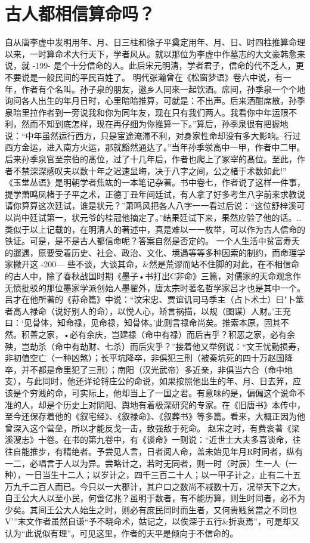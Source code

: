{{\section{古人都相信算命吗？}
自从唐李虚中发明用年、月、日三柱和徐子平奠定用年、月、日、时四柱推算命理以来，一时算命术大行天下，学者风从。就以那位为李虚中作墓志的大文豪韩愈来说，就
-199-
是个十分信命的人。此后宋元明清，学者君子，信命的代不乏人，更不要说是一般民间的平民百姓了。
明代张瀚曾在《松窗梦语》卷六中说，有一年，作者有个名叫。孙子泉的朋友，遨乡人同來一起饮酒。席间，孙季泉一个个地询问各人出生的年月日时，心里暗暗推算，可就是：不出声。后来洒酣席散，孙季泉暗里拉作者到一旁说我和你为同年友，现在只有我们两人。我看你中年运限不利，然而不知到底怎样，现在再仔细为你推算一下。”算后，孙季泉很有把握地说：“中年虽然运行西方，只是宦途淹滞不利，对身家性命却没有多大影响。行过西方金运，进入南方火运，那就豁然通达了。”当年孙季泶高中一甲，作者中二甲。后来孙季泉官至宗伯的髙位，过了十几年后，作者也爬上了冢宰的髙位。至此，作者不禁深深感叹夫以数十年之迟速显晦，决于八字之间，公之楮于术数如此!”
《玉堂丛语》是明朝学者焦竑的一本笔记杂著。书中卷七，作者说了这样一件事，提学萧鸣凤楮于子平之术，正德丁丑年间廷试，有人拿了好多考生八字前来求教说请你算算这次廷试，谁是状元？”萧鸣风把各人八字一一看过后说：“这位舒梓溪可以尚中廷试第一，状元爷的桂冠他摘定了。”结果廷试下来，果然应验了他的话。..
类似于以上记载的，在明清人的著述中，真是难以一一枚举，可以作为古人信命的铁证。可是，是不是古人都信命呢？答案自然是否定的。
一个人生活中贫富寿夭的遛遇，原要受着历史、社会、政治、文化、境遇等等多种因索的制约，而命理学家撇开这
-200—
些不谈，大谈其命，&然是荒谬而站不住脚的对此，在不相信命的古人中，除了春秋战国时期《墨子•书打出C非命》三篇，对儒家的天命观念作无愤批驳的那位墨家学派创始人墨翟外，唐太宗时著名哲学家吕才也是其中一个。吕才在他所著的《荪命篇》中说：“汶宋忠、贾谊讥司马季主（占卜术士）曰"卜筮者高人禄命（说好别人的命），以悦人心，矫言祸描，以规（图谋）人财。’王充曰：‘见骨体，知命禄，见命禄，知骨体。’此则言禄命尚矣。推索本原，固其不然。积善之家，•必有余庆，岂建禄（命中有禄）而后吉乎？积恶之家，必有余殃，岂劫杀（命中有劫财、七杀）而后灾乎？”接着他又举例说：“文王忧勤损寿，非初值空亡（一种凶煞）；长平坑降卒，非俱犯三刑（被秦坑死的四十万赵国降卒，并不都是命里犯了三刑）；南阳（汉光武帝）多近亲，非俱当六合（命中地支），与此同时，他还详论锊庄公的命说，如果按照他出生的年、月、日去笄，应该是个穷贱的命，可实际上，他却当上了一国之君。有意味的是，偏偏这个说命不准的人，却是个历史上对阴阳、舆地有着极深研究的专家。在《旧唐书》本传中，至今还保存着他的《叙宅经》、《叙禄命》、《叙葬书》等多篇。看来，大概正因为他曾深入这个营垒，所以才能反戈一击，致强敌于死命。
赵宋之时，有费衮著《梁溪溲志》十卷。在书的第九卷中，有《谈命》一则说：“近世士大夫多喜谈命，往往自能推步，有精绝者。予尝见人言，日者阅人命，盖未始见年月R时同者，纵有一二，必唱言于人以为异。尝略计之，若时无同者，则一时（时辰）生一人（一种），一日当生十二人；以岁计之，四千三百二十人；以一甲子计之，止有二十五万九千二百人而已。今只以一大郡计，其户口之数尚不减数十万，况举天下之大，自王公大人以至小民，何啻亿兆？虽明于数者，有不能历算，则生时同者，必不为少矣。其间王公大人始生之时，则必有庶民同时而生者，又何贵贱贫當之不同也V’”末文作者虽然自谦“予不晓命术，姑记之，以俟深于五行&折衷焉”，可是却又认为“此说似有理”。可见这里，作者的天平是倾向于不信命的。

}}
